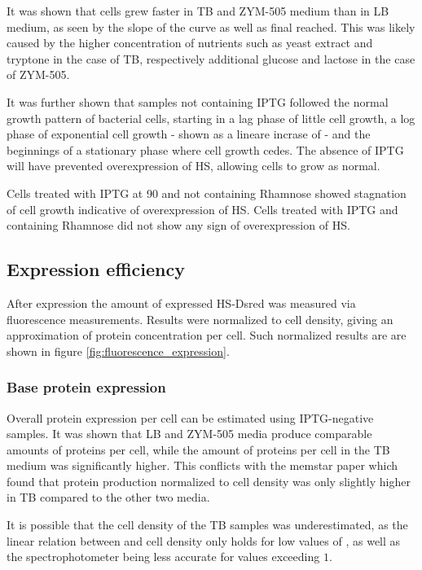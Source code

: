 It was shown that cells grew faster in TB and ZYM-505 medium than in LB medium,
as seen by the slope of the curve as well as final \odbact reached. This was
likely caused by the higher concentration of nutrients such as yeast extract
and tryptone in the case of TB, respectively additional glucose and lactose in
the case of ZYM-505.

It was further shown that samples not containing IPTG followed the normal
growth pattern of bacterial cells, starting in a lag phase of little cell
growth, a log phase of exponential cell growth - shown as a lineare incrase of
\odbact - and the beginnings of a stationary phase where cell growth cedes. The
absence of IPTG will have prevented overexpression of HS, allowing cells to
grow as normal.

Cells treated with IPTG at \SI{90}{\min} and not containing Rhamnose showed
stagnation of cell growth indicative of overexpression of HS. Cells treated
with IPTG and containing Rhamnose did not show any sign of overexpression of
HS.

\subsection{Expression efficiency}

After expression the amount of expressed HS-Dsred was measured via fluorescence
measurements. Results were normalized to cell density, giving an approximation
of protein concentration per cell. Such normalized results are are shown in
figure \ref{fig:fluorescence_expression}.

\subsubsection{Base protein expression}

Overall protein expression per cell can be estimated using IPTG-negative
samples. It was shown that LB and ZYM-505 media produce comparable amounts of
proteins per cell, while the amount of proteins per cell in the TB medium was
significantly higher. This conflicts with the memstar paper which found that
protein production normalized to cell density was only slightly higher in TB
compared to the other two media. \cite{memstar}

It is possible that the cell density of the TB samples was underestimated, as
the linear relation between \odbact and cell density only holds for low values
of \odbact, as well as the spectrophotometer being less accurate for values
exceeding $1$.

